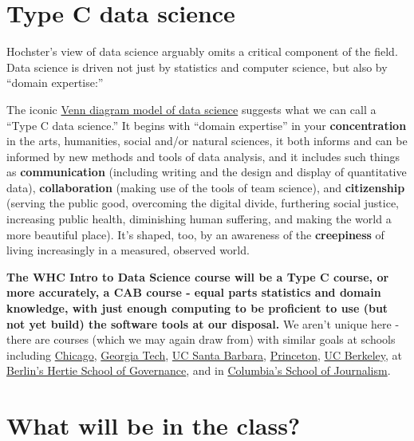\documentclass[]{book}
\theoremstyle{definition}
\theoremstyle{definition}
\theoremstyle{definition}
\theoremstyle{remark}
\begin{document}
\hypertarget{type-c-data-science}{%
\section{Type C data science}\label{type-c-data-science}}

Hochster's view of data science arguably omits a critical component of
the field. Data science is driven not just by statistics and computer
science, but also by ``domain expertise:''

The iconic
\href{https://www.google.com/search?q=venn+diagram+model+of+data+science\&newwindow=1\&safe=active\&rlz=1C1CHBF_enUS762US763\&tbm=isch\&tbo=u\&source=univ\&sa=X\&ved=0ahUKEwiM_abBtY7XAhXDQCYKHdgyB58QsAQIOg\&biw=1378}{Venn
diagram model of data science} suggests what we can call a ``Type C data
science.'' It begins with ``domain expertise'' in your
\textbf{concentration} in the arts, humanities, social and/or natural
sciences, it both informs and can be informed by new methods and tools
of data analysis, and it includes such things as \textbf{communication}
(including writing and the design and display of quantitative data),
\textbf{collaboration} (making use of the tools of team science), and
\textbf{citizenship} (serving the public good, overcoming the digital
divide, furthering social justice, increasing public health, diminishing
human suffering, and making the world a more beautiful place). It's
shaped, too, by an awareness of the \textbf{creepiness} of living
increasingly in a measured, observed world.

\textbf{The WHC Intro to Data Science course will be a Type C course, or
more accurately, a CAB course - equal parts statistics and domain
knowledge, with just enough computing to be proficient to use (but not
yet build) the software tools at our disposal.} We aren't unique here -
there are courses (which we may again draw from) with similar goals at
schools including
\href{https://github.com/UC-MACSS/persp-analysis}{Chicago},
\href{https://github.com/jacobeisenstein/gt-css-class}{Georgia Tech},
\href{https://github.com/raviolli77/dataScience-UCSBProjectGroup-Syllabus}{UC
Santa Barbara},
\href{http://www.princeton.edu/~mjs3/soc596_f2016/}{Princeton},
\href{https://github.com/rochelleterman/PS239T}{UC Berkeley}, at
\href{https://github.com/HertieDataScience/SyllabusAndLectures}{Berlin's
Hertie School of Governance}, and in
\href{https://github.com/tommeagher/data1-fall2015}{Columbia's School of
Journalism}.

\hypertarget{what-will-be-in-the-class}{%
\section{What will be in the class?}\label{what-will-be-in-the-class}}
\end{document}
